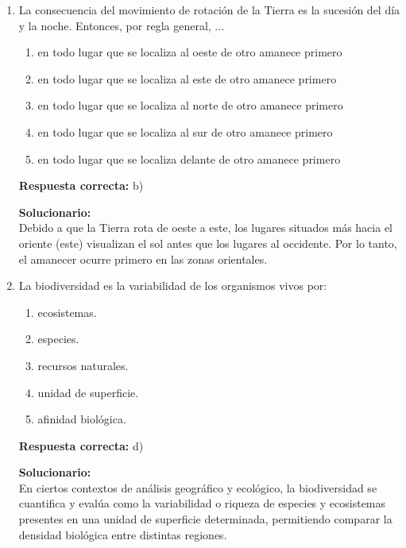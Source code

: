 \begin{enumerate}
	
	\item La consecuencia del movimiento de rotación de la Tierra es la sucesión del día y la noche. Entonces, por regla general, ...
	\begin{enumerate}[label=\alph*)]
		\item en todo lugar que se localiza al oeste de otro amanece primero
		\item en todo lugar que se localiza al este de otro amanece primero
		\item en todo lugar que se localiza al norte de otro amanece primero
		\item en todo lugar que se localiza al sur de otro amanece primero
		\item en todo lugar que se localiza delante de otro amanece primero
	\end{enumerate}
	\textbf{Respuesta correcta:} b)
	
	\vspace{2mm}
	\textbf{Solucionario:}\\
	Debido a que la Tierra rota de oeste a este, los lugares situados más hacia el oriente (este) visualizan el sol antes que los lugares al occidente. Por lo tanto, el amanecer ocurre primero en las zonas orientales.
	
	\vspace{6mm}
	
	\item La biodiversidad es la variabilidad de los organismos vivos por:
	\begin{enumerate}[label=\alph*)]
		\item ecosistemas.
		\item especies.
		\item recursos naturales.
		\item unidad de superficie.
		\item afinidad biológica.
	\end{enumerate}
	\textbf{Respuesta correcta:} d)
	
	\vspace{2mm}
	\textbf{Solucionario:}\\
	En ciertos contextos de análisis geográfico y ecológico, la biodiversidad se cuantifica y evalúa como la variabilidad o riqueza de especies y ecosistemas presentes en una unidad de superficie determinada, permitiendo comparar la densidad biológica entre distintas regiones.
	
	\vspace{6mm}
	
\end{enumerate}


